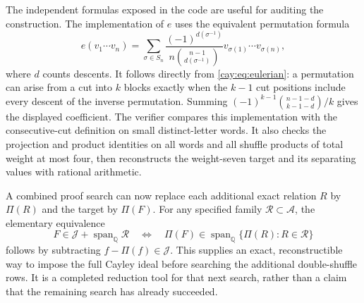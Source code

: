 The independent formulas exposed in the code are useful for auditing
the construction.  The implementation of $e$ uses the equivalent
permutation formula
\[
 e(v_1\cdots v_n)=\sum_{\sigma\in S_n}
 \frac{(-1)^{d(\sigma^{-1})}}
 {n\binom{n-1}{d(\sigma^{-1})}}
 v_{\sigma(1)}\cdots v_{\sigma(n)},
\]
where $d$ counts descents.  It follows directly from
\eqref{cay:eq:eulerian}: a permutation can arise from a cut into $k$
blocks exactly when the $k-1$ cut positions include every descent of
the inverse permutation.  Summing
$(-1)^{k-1}\binom{n-1-d}{k-1-d}/k$ gives the displayed coefficient.
The verifier compares this implementation with the consecutive-cut
definition on small distinct-letter words.  It also checks the
projection and product identities on all words and all shuffle products
of total weight at most four, then reconstructs the weight-seven target
and its separating values with rational arithmetic.

A combined proof search can now replace each additional exact
relation $R$ by $\Pi(R)$ and the target by $\Pi(F)$.  For any specified
family $\mathscr R\subset\mathcal A$, the elementary equivalence
\[
 F\in\mathcal J+\operatorname{span}_{\mathbb Q}\mathscr R
 \quad\Longleftrightarrow\quad
 \Pi(F)\in\operatorname{span}_{\mathbb Q}\{\Pi(R):R\in\mathscr R\}
\]
follows by subtracting $f-\Pi(f)\in\mathcal J$.
This supplies an exact, reconstructible way to impose the full
Cayley ideal before searching the additional double-shuffle rows.
It is a completed reduction tool for that next search, rather than a
claim that the remaining search has already succeeded.
